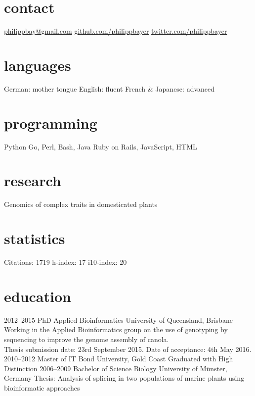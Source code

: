 \documentclass[]{friggeri-cv} %
\begin{document}


\begin{aside} %
\section{contact}
\href{mailto:philippbay@gmail.com}{philippbay@gmail.com}
\href{http://github.com/philippbayer}{github.com/philippbayer}
\href{http://twitter.com/philippbayer}{twitter.com/philippbayer}
\section{languages}
German: mother tongue
English: fluent
French \& Japanese: advanced
\section{programming}
Python
Go, Perl, Bash, Java
Ruby on Rails, JavaScript, HTML
\section{research}
Genomics of complex traits in domesticated plants
\section{statistics}
Citations: 1719
h-index: 17
i10-index: 20
\end{aside}


\section{education}

\begin{entrylist}
\entry
{2012--2015}
{PhD {\normalfont Applied Bioinformatics}}
{University of Queensland, Brisbane}
{Working in the Applied Bioinformatics group on the use of genotyping by sequencing to improve the genome assembly of canola.\\Thesis submission date: 23rd September 2015. Date of acceptance: 4th May 2016.}
\entry
{2010--2012}
{Master {\normalfont of IT}}
{Bond University, Gold Coast}
{Graduated with High Distinction}
\entry
{2006--2009}
{Bachelor of Science {\normalfont Biology}}
{University of Münster, Germany}
{Thesis: Analysis of splicing in two populations of marine plants
using bioinformatic approaches}
\end{entrylist}
\end{document}
